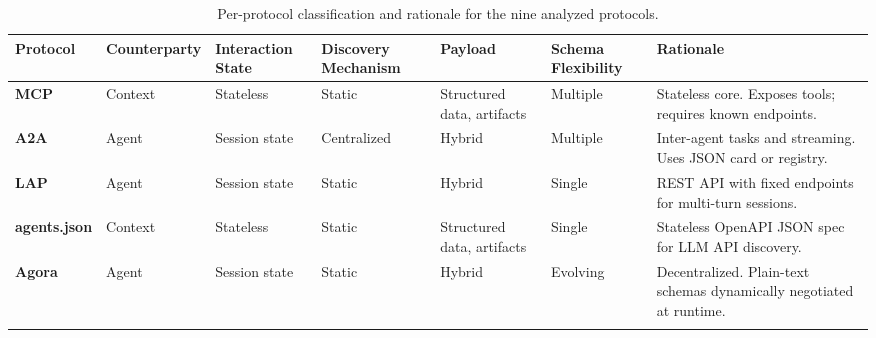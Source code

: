 \documentclass[pdflatex,sn-mathphys-num]{sn-jnl}%
\theoremstyle{thmstyleone}%
\theoremstyle{thmstyletwo}%
\theoremstyle{thmstylethree}%
\begin{document}

\begin{table}
\centering
\scriptsize
\renewcommand{\arraystretch}{1.2}
\setlength{\tabcolsep}{3pt}

\caption{Per-protocol classification and rationale for the nine analyzed protocols.}
\label{tab:protocol-classification-text}

\begin{tabularx}{\textwidth}{
    >{\raggedright\arraybackslash}p{2.3cm}
    >{\raggedright\arraybackslash}p{2.1cm}
    >{\raggedright\arraybackslash}p{1.8cm}
    >{\raggedright\arraybackslash}p{2.1cm}
    >{\raggedright\arraybackslash}p{2.1cm}
    >{\raggedright\arraybackslash}p{1.8cm}
    >{\raggedright\arraybackslash}X
}
\toprule
\textbf{Protocol} &
\textbf{Counterparty} &
\textbf{Interaction State} &
\textbf{Discovery Mechanism} &
\textbf{Payload} &
\textbf{Schema Flexibility} &
\textbf{Rationale} \\
\midrule

\textbf{MCP} \newline \footnotesize \cite{mcpgit,mcpdocscorearchitecture} &
Context &
Stateless &
Static &
Structured data, artifacts &
Multiple &
Stateless core. Exposes tools; requires known endpoints. \\
\addlinespace

\textbf{A2A} \newline \footnotesize \cite{a2agit,a2adocsmcp,a2adocskeyconcepts,a2adocsagentdiscovery,a2adocsspecification} &
Agent &
Session state &
Centralized &
Hybrid &
Multiple &
Inter-agent tasks and streaming. Uses JSON card or registry. \\
\addlinespace

\textbf{LAP} \newline \footnotesize \cite{lapgit,lapdocsapi} &
Agent &
Session state &
Static &
Hybrid &
Single &
REST API with fixed endpoints for multi-turn sessions. \\
\addlinespace

\textbf{agents.json} \newline \footnotesize \cite{agentsjsongit,agentsjsonintro,agentsjsonschema} &
Context &
Stateless &
Static &
Structured data, artifacts &
Single &
Stateless OpenAPI JSON spec for LLM API discovery. \\
\addlinespace

\textbf{Agora} \newline \footnotesize \cite{marro2024scalable,agoragit,agoraspecification} &
Agent &
Session state &
Static &
Hybrid &
Evolving &
Decentralized. Plain-text schemas dynamically negotiated at runtime. \\
\addlinespace


\end{tabularx}
\end{table}
\end{document}
